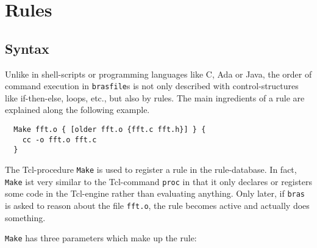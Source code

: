 \documentclass[11pt]{scrartcl}
\makeatletter
\newcommand{\bras}{\texttt{bras}}
\newcommand{\brasfile}{\texttt{brasfile}}
\newcommand{\Indextt}[1]{\texttt{#1}\index{#1@\texttt{#1}}}
\makeatother
\begin{document}
\section{Rules}
\label{SecDefTerms}

\subsection{Syntax}
Unlike in shell-scripts or programming languages like C, Ada or Java,
the order of command execution in \brasfile{}s is not only described
with control-structures like if-then-else, loops, etc., but also by
rules.  The main ingredients of a rule are explained along the
following example.

\begin{verbatim}
  Make fft.o { [older fft.o {fft.c fft.h}] } {
    cc -o fft.o fft.c
  }
\end{verbatim}

The Tcl-procedure \Indextt{Make} is used to register a rule in the
rule-database. In fact, \texttt{Make} ist very similar to the
Tcl-command \texttt{proc} in that it only declares or registers some
code in the Tcl-engine rather than evaluating anything. Only later, if 
\bras{} is asked to reason about the file \texttt{fft.o}, the rule
becomes active and actually does something.

\texttt{Make} has three parameters which make up the rule:
\end{document}

